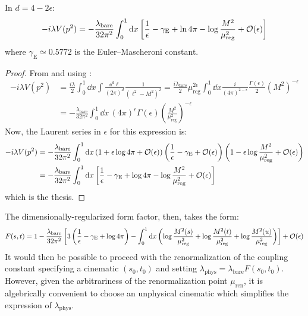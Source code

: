 \begin{proposition}{}{}
  In $ d = 4 - 2\epsilon $:
  \begin{equation}
    -i \lambda V(p^2) = - \frac{\lambda_\text{bare}}{32\pi^2} \int_0^1 \mathrm{d} x \left[ \frac{1}{\epsilon} - \gamma_\text{E} + \ln 4\pi - \log \frac{M^2}{\mu_\text{reg}^2} + \mathcal{O}(\epsilon) \right]
  \end{equation}
  where $ \gamma_\text{E} \simeq 0.5772 $ is the Euler--Mascheroni constant.
\end{proposition}

\begin{proofbox}
  \begin{proof}
    From  and using :
    \begin{equation*}
      \begin{split}
        -i \lambda V(p^2)
        & = \frac{i \lambda}{2} \int_0^1 \dd x \int \frac{\dd^d\ell}{(2\pi)^d} \frac{1}{(\ell^2 - M^2)^2} = \frac{i \lambda_\text{bare}}{2} \mu_\text{reg}^{2\epsilon} \int_0^1 \dd x \frac{i}{(4\pi)^{2 - \epsilon}} \frac{\Gamma(\epsilon)}{2} (M^2)^{-\epsilon} \\
        & = - \frac{\lambda_\text{bare}}{32\pi^2} \int_0^1 \dd x \, (4\pi)^\epsilon \Gamma(\epsilon) \left( \frac{M^2}{\mu_\text{reg}^2} \right)^{-\epsilon}
      \end{split}
    \end{equation*}
    Now, the Laurent series in $ \epsilon $ for this expression is:
    \begin{equation*}
      \begin{split}
        -i \lambda V(p^2)
        &= - \frac{\lambda_\text{bare}}{32\pi^2} \int_0^1 \mathrm{d} x \left( 1 + \epsilon \log 4\pi + \mathcal{O}(\epsilon) \right) \left( \frac{1}{\epsilon} - \gamma_\text{E} + \mathcal{O}(\epsilon) \right) \left( 1 - \epsilon \log \frac{M^2}{\mu_\text{reg}^2} + \mathcal{O}(\epsilon) \right) \\
        & = - \frac{\lambda_\text{bare}}{32\pi^2} \int_0^1 \mathrm{d} x \left[ \frac{1}{\epsilon} - \gamma_\text{E} + \log 4\pi - \log \frac{M^2}{\mu_\text{reg}^2} + \mathcal{O}(\epsilon) \right]
      \end{split}
    \end{equation*}
    which is the thesis.
  \end{proof}
\end{proofbox}

The dimensionally-regularized form factor, then, takes the form:
\begin{equation*}
  F(s,t) = 1 - \frac{\lambda_\text{bare}}{32\pi^2} \left[ 3 \left( \frac{1}{\epsilon} - \gamma_\text{E} + \log 4\pi \right) - \int_0^1 \mathrm{d} x \left( \log \frac{M^2(s)}{\mu_\text{reg}^2} + \log \frac{M^2(t)}{\mu_\text{reg}^2} + \log \frac{M^2(u)}{\mu_\text{reg}^2} \right) \right] + \mathcal{O}(\epsilon)
\end{equation*}
It would then be possible to proceed with the renormalization of the coupling constant specifying a cinematic $ (s_0,t_0) $ and setting $ \lambda_\text{phys} = \lambda_\text{bare} F(s_0,t_0) $. However, given the arbitrariness of the renormalization point $ \mu_\text{ren} $, it is algebrically convenient to choose an unphysical cinematic which simplifies the expression of $ \lambda_\text{phys} $.

